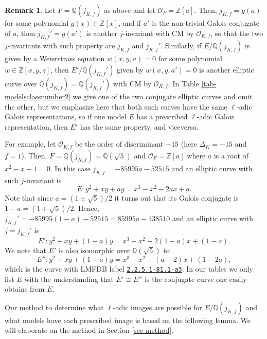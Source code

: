 \documentclass[11pt]{amsart}
\theoremstyle{definition}
\newtheorem{remark}[defn]{Remark}
\newcommand{\Q}{\mathbb Q}
\newcommand{\Z}{\mathbb Z}
\newcommand{\OF}{\mathcal{O}_F}
\newcommand{\Of}{\mathcal{O}_{K,f}}
\begin{document}
\begin{remark}\label{rem-conjugates}
    Let $F=\Q(j_{K,f})$ as above and let $\mathcal{O}_F = \Z[a]$. Then, $j_{K,f}=g(a)$ for some polynomial $g(x)\in \Z[x]$, and if $a'$ is the non-trivial Galois conjugate of $a$, then $j_{K,f}'=g(a')$ is another $j$-invariant with CM by $\Of$, so that the two $j$-invariants with such property are $j_{K,f}$ and $j_{K,f}'$. Similarly, if $E/\Q(j_{K,f})$ is given by a Weierstrass equation $w(x,y,a)=0$ for some polynomial $w\in \Z[x,y,z]$, then $E'/\Q(j_{K,f}')$ given by $w(x,y,a')=0$ is another elliptic curve over $\Q(j_{K,f})=\Q(j_{K,f}')$ with CM by $\Of$. In Table \ref{tab-modelsclassnumber2} we give one of the two conjugate elliptic curves and omit the other, but we emphasize here that both such curves have the same $\ell$-adic Galois representations, so if one model $E$ has a prescribed $\ell$-adic Galois representation, then $E'$ has the same property, and viceversa.

    For example, let $\Of$ be the order of discriminant $-15$ (here $\Delta_K=-15$ and $f=1$). Then, $F=\Q(j_{K,f})=\Q(\sqrt{5})$ and $\OF=\Z[a]$ where $a$ is a root of $x^2-x-1=0$. In this case $j_{K,f}=-85995a-52515$ and an elliptic curve with such $j$-invariant is 
    $$E: y^2+xy+ay=x^3-x^2-2ax+a.$$
    Note that since $a = (1\pm \sqrt{5})/2$ it turns out that its Galois conjugate is $1-a = (1\mp \sqrt{5})/2$. Hence, $j_{K,f}'=-85995(1-a)-52515 = 85995a - 138510$ and an elliptic curve with $j=j_{K,f}'$ is 
    $$E': y^2+xy+(1-a)y=x^3-x^2-2(1-a)x+(1-a).$$
    We note that $E'$ is also isomorphic over $\Q(\sqrt{5})$ to 
    $$E'': y^2+xy+(1+a)y=x^3-x^2+(a-2)x+(1-2a),$$
    which is the curve with LMFDB label \href{https://www.lmfdb.org/EllipticCurve/2.2.5.1/81.1/a/3}{\texttt{2.2.5.1-81.1-a3}}. In our tables we only list $E$ with the understanding that $E'\cong E''$ is the conjugate curve one easily obtains from $E$.
\end{remark}

Our method to determine what $\ell$-adic images are possible for $E/\Q(j_{K,f})$ and what models have each prescribed image is based on the following lemma. We will elaborate on the method in Section \ref{sec-method}.
 
\end{document}
